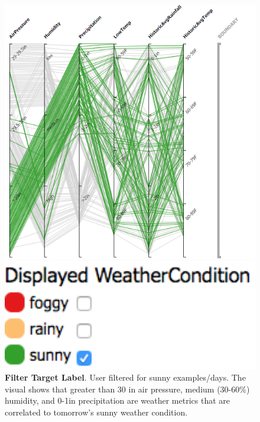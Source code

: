\begin{figure}
    \centering
    \begin{minipage}{0.7\textwidth}
        \centering
        \includegraphics[width=.85\textwidth]{FilterTargetLabel}
    \end{minipage}\hfill
    \begin{minipage}{0.3\textwidth}
        \centering
        \includegraphics[width=1\textwidth]{FilterTargetLabelLegend}
    \end{minipage}
    \caption{\textbf{Filter Target Label}. User filtered for sunny examples/days. The visual shows that greater than 30 in air pressure, medium (30-60\%) humidity, and 0-1in precipitation are weather metrics that are correlated to tomorrow's sunny weather condition.}
    \label{fig:FilterTargetLabel}
\end{figure}

